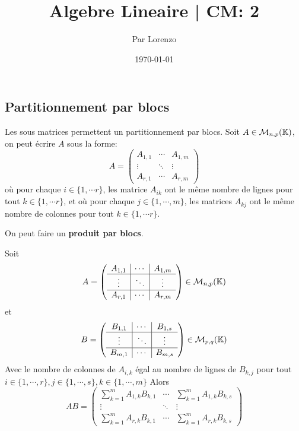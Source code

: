 \documentclass[a4paper, 12pt]{article}
\title{Algebre Lineaire | CM: 2}
\author{Par Lorenzo}
\date{\today}
\begin{document}
\maketitle

\subsection{Partitionnement par blocs}

\begin{definition}
    Les sous matrices permettent un partitionnement par blocs.
    Soit $A \in \mathcal{M}_{n,p}(\mathbb{K})$, on peut écrire $A$ sous la forme:
    $$
    A = \left(
    \begin{array}{c|c|c}
        A_{1,1} & \cdots & A_{1,m} \\
        \hline
        \vdots & \ddots & \vdots \\
        \hline
        A_{r,1} & \cdots & A_{r,m}
    \end{array}
    \right)
    $$
    où pour chaque $i \in \{1, \cdots r\}$, les matrice $A_{ik}$ ont le même nombre de lignes pour tout $k \in \{1, \cdots r\}$,
    et où pour chaque $j \in \{1, \cdots, m\}$, les matrices $A_{kj}$ ont le même nombre de colonnes pour tout $k \in \{1, \cdots r\}$.
\end{definition}

\begin{definition}
    On peut faire un \textbf{produit par blocs}.

    Soit
    $$
    A = \left(
    \begin{array}{c|c|c}
        A_{1,1} & \cdots & A_{1,m} \\
        \hline
        \vdots & \ddots & \vdots \\
        \hline
        A_{r,1} & \cdots & A_{r,m}
    \end{array}
    \right)
    \in \mathcal{M}_{n,p}(\mathbb{K})
    $$
    et
    $$
    B = \left(
    \begin{array}{c|c|c}
        B_{1,1} & \cdots & B_{1,s} \\
        \hline
        \vdots & \ddots & \vdots \\
        \hline
        B_{m,1} & \cdots & B_{m,s}
    \end{array}
    \right)
    \in \mathcal{M}_{p,q}(\mathbb{K})
    $$
    Avec le nombre de colonnes de $A_{i,k}$ égal au nombre de lignes de $B_{k,j}$ pour tout
    $i \in \{1, \cdots, r\}, j \in \{1, \cdots, s\}, k \in \{1, \cdots, m\}$ Alors 
    $$
    AB = \left(
    \begin{array}{c|c|c}
        \sum_{k=1}^{m}A_{1,k}B_{k,1} & \cdots & \sum_{k=1}^{m}A_{1,k}B_{k,s} \\
        \hline
        \vdots & \ddots & \vdots \\
        \hline
        \sum_{k=1}^{m}A_{r,k}B_{k,1} & \cdots & \sum_{k=1}^{m}A_{r,k}B_{k,s}
    \end{array}
    \right)
    $$
\end{definition}
\end{document}
